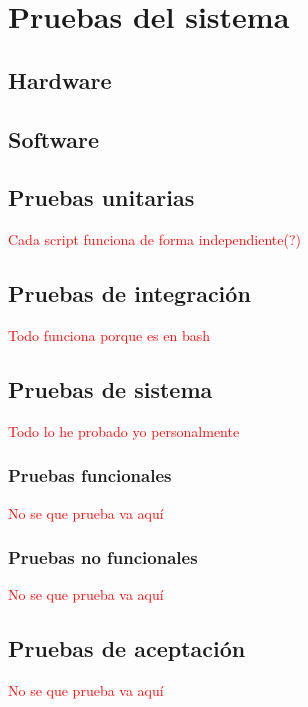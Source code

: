 \chapter{Pruebas del sistema}

\section{Hardware}


\section{Software}


\section{Pruebas unitarias}
\textcolor{red}{Cada script funciona de forma independiente(?)}

\section{Pruebas de integración}
\textcolor{red}{Todo funciona porque es en bash}

\section{Pruebas de sistema}
\textcolor{red}{Todo lo he probado yo personalmente}

\subsection{Pruebas funcionales}
\textcolor{red}{No se que prueba va aquí}

\subsection{Pruebas no funcionales}
\textcolor{red}{No se que prueba va aquí}

\section{Pruebas de aceptación}
\textcolor{red}{No se que prueba va aquí}